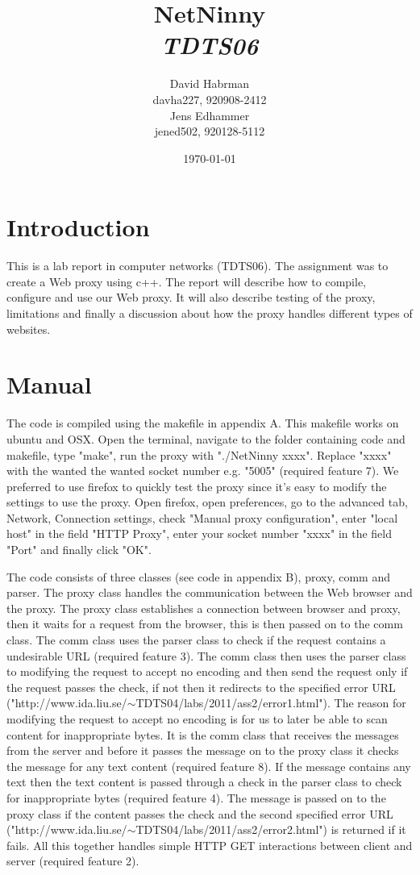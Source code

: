\documentclass[10pt]{article}
\title{NetNinny\\
\emph{TDTS06}}
\author{David Habrman \\ davha227, 920908-2412\\
Jens Edhammer \\ jened502, 920128-5112 }
\date{\today}
\begin{document}
\maketitle

\newpage
\tableofcontents
\newpage

\section{Introduction}
This is a lab report in computer networks (TDTS06). The assignment was
to create a Web proxy using c++. The report will describe how to compile,
configure and use our Web proxy. It will also describe testing of the proxy,
limitations and finally a discussion about how the proxy handles different
types of websites.

\section{Manual}
The code is compiled using the makefile in appendix A. This makefile works on
ubuntu and OSX. Open the terminal, navigate to the folder containing code and
makefile, type "make", run the proxy with "./NetNinny xxxx". Replace "xxxx"
with the wanted the wanted socket number e.g. "5005" (required feature 7).
We preferred to use firefox to quickly test the proxy since it's easy to
modify the settings to use the proxy. Open firefox, open preferences, go to
the advanced tab, Network, Connection settings, check
"Manual proxy configuration", enter "local host" in the field "HTTP Proxy",
enter your socket number "xxxx" in the field "Port" and finally click "OK".

The code consists of three classes (see code in appendix B), proxy, comm and
parser. The proxy class handles the communication between the Web browser and
the proxy. The proxy class establishes a connection between browser and proxy,
then it waits for a request from the browser, this is then passed on to the comm
class. The comm class uses the parser class to check if the request contains a
undesirable URL (required feature 3). The comm class then uses the parser class
to modifying the request to accept no encoding and then send the request only if
the request passes the check, if not then it redirects to the specified error URL
("http://www.ida.liu.se/$\sim$TDTS04/labs/2011/ass2/error1.html"). The reason
for modifying the request to accept no encoding is for us to later be able to
scan content for inappropriate bytes.
It is the comm class that receives the messages from the server and before
it passes the message on to the proxy class it checks the message for any
text content (required feature 8). If the message contains any text then the
text content is passed through a check in the parser class to check for
inappropriate bytes (required feature 4). The message is passed on to the
proxy class if the content passes the check and the second specified error URL
("http://www.ida.liu.se/$\sim$TDTS04/labs/2011/ass2/error2.html") is returned if it
fails. All this together handles simple HTTP GET interactions between client
and server (required feature 2).
\end{document}
